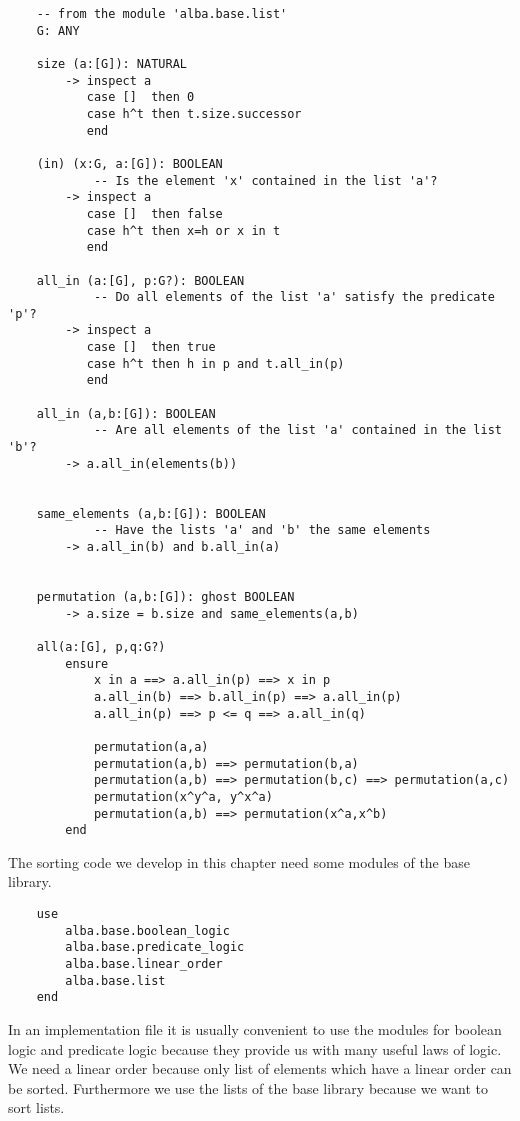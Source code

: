 \begin{lstlisting}
    -- from the module 'alba.base.list'
    G: ANY

    size (a:[G]): NATURAL
        -> inspect a
           case []  then 0
           case h^t then t.size.successor
           end

    (in) (x:G, a:[G]): BOOLEAN
            -- Is the element 'x' contained in the list 'a'?
        -> inspect a
           case []  then false
           case h^t then x=h or x in t
           end

    all_in (a:[G], p:G?): BOOLEAN
            -- Do all elements of the list 'a' satisfy the predicate 'p'?
        -> inspect a
           case []  then true
           case h^t then h in p and t.all_in(p)
           end

    all_in (a,b:[G]): BOOLEAN
            -- Are all elements of the list 'a' contained in the list 'b'?
        -> a.all_in(elements(b))


    same_elements (a,b:[G]): BOOLEAN
            -- Have the lists 'a' and 'b' the same elements
        -> a.all_in(b) and b.all_in(a)


    permutation (a,b:[G]): ghost BOOLEAN
        -> a.size = b.size and same_elements(a,b)

    all(a:[G], p,q:G?)
        ensure
            x in a ==> a.all_in(p) ==> x in p
            a.all_in(b) ==> b.all_in(p) ==> a.all_in(p)
            a.all_in(p) ==> p <= q ==> a.all_in(q)

            permutation(a,a)
            permutation(a,b) ==> permutation(b,a)
            permutation(a,b) ==> permutation(b,c) ==> permutation(a,c)
            permutation(x^y^a, y^x^a)
            permutation(a,b) ==> permutation(x^a,x^b)
        end
\end{lstlisting}

The sorting code we develop in this chapter need some modules of the base
library.

\begin{lstlisting}
    use
        alba.base.boolean_logic
        alba.base.predicate_logic
        alba.base.linear_order
        alba.base.list
    end
\end{lstlisting}

In an implementation file it is usually convenient to use the modules for
boolean logic and predicate logic because they provide us with many useful
laws of logic. We need a linear order because only list of elements which have
a linear order can be sorted. Furthermore we use the lists of the base library
because we want to sort lists.

